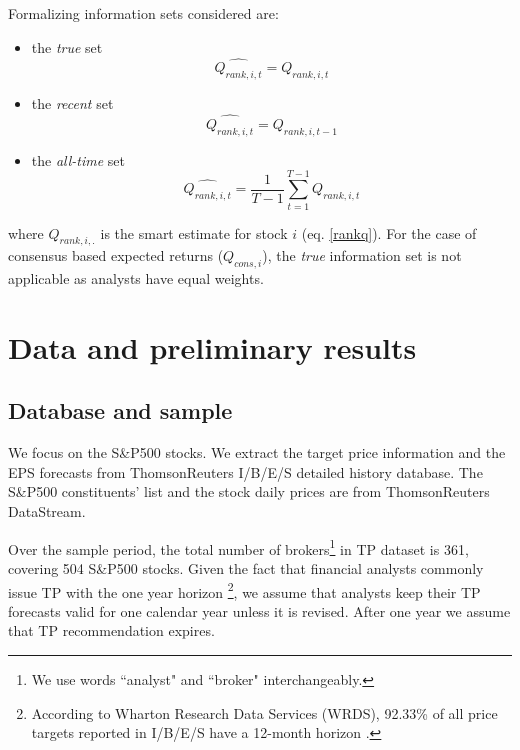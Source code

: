 \documentclass{article}\usepackage[]{graphicx}\usepackage[]{color}
\newcommand{\tr}{\textit{true}}
\newcommand{\naive}{\textit{recent}}
\newcommand{\default}{\textit{all-time}}
\begin{document}
Formalizing information sets considered are: 
\begin{itemize}
\item  the \tr{} set%
\begin{equation}
\label{q:true}
\widehat{Q_{rank,i,t}}=Q_{rank,i,t}
\end{equation}
% 
\item  the \naive{} set %
\begin{equation}
\label{q:naive}
\widehat{Q_{rank,i,t}}=Q_{rank,i,t-1}
\end{equation}
% 
\item  the \default{}  set%
\begin{equation}
\label{q:default}
\widehat{Q_{rank,i,t}} = \frac{1}{T-1} \sum_{t=1}^{T-1} Q_{rank,i,t}
\end{equation}
\end{itemize}
where  $Q_{rank,i,.}$ is the smart estimate for stock $i$ (eq. \ref{rankq}). For the case of consensus based expected returns ($Q_{cons,i}$), the \tr{} information set is not applicable as analysts have equal weights.


\section{Data and preliminary results}
\label{sec:rankings}

\subsection{Database and sample}
We focus on the  S\&P500 stocks. We extract the target price information and the EPS forecasts from ThomsonReuters  I/B/E/S detailed history database. The  S\&P500 constituents' list and the stock daily prices are from ThomsonReuters DataStream.


Over the sample period, the total number of brokers\footnote{We use words ``analyst" and ``broker" interchangeably.} in TP dataset is 361, covering 504 S\&P500 stocks. Given the fact that financial analysts commonly issue TP with the one year horizon \footnote{According to Wharton Research Data Services (WRDS), 92.33\% of all price targets reported in I/B/E/S have a 12-month horizon \citep{glushkov2009}.}, we assume that analysts keep their TP forecasts valid for one calendar year unless it is revised. After one year we assume that TP recommendation expires.
\end{document}
